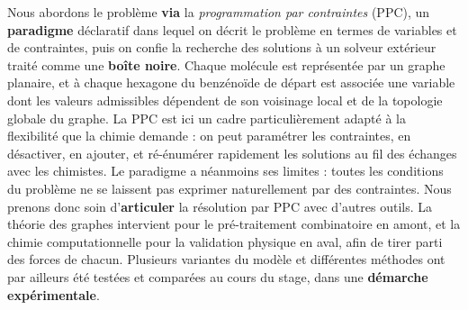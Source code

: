 \documentclass[11pt,a4paper]{article}
\begin{document}
Nous abordons le problème \textbf{via} la \emph{programmation par
contraintes} (PPC), un \textbf{paradigme} déclaratif dans lequel on
décrit le problème en termes de variables et de contraintes, puis on
confie la recherche des solutions à un solveur extérieur traité comme
une \textbf{boîte noire}. Chaque molécule est représentée par un graphe
planaire, et à chaque hexagone du benzénoïde de départ est associée une
variable dont les valeurs admissibles dépendent de son voisinage local
et de la topologie globale du graphe. La PPC est ici un cadre
particulièrement adapté à la flexibilité que la chimie demande : on
peut paramétrer les contraintes, en désactiver, en ajouter, et
ré-énumérer rapidement les solutions au fil des échanges avec les
chimistes. Le paradigme a néanmoins ses limites : toutes les conditions
du problème ne se laissent pas exprimer naturellement par des
contraintes. Nous prenons donc soin d'\textbf{articuler} la résolution
par PPC avec d'autres outils. La théorie des graphes intervient pour
le pré-traitement combinatoire en amont, et la chimie computationnelle
pour la validation physique en aval, afin de tirer parti des forces de
chacun. Plusieurs variantes du modèle et différentes méthodes ont par
ailleurs été testées et comparées au cours du stage, dans une
\textbf{démarche expérimentale}.
\end{document}
